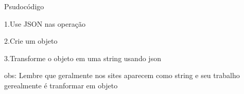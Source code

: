 Psudocódigo

1.Use JSON nas operação

2.Crie um objeto

3.Transforme o objeto em uma string usando json

obs: Lembre que geralmente nos sites aparecem como string e seu trabalho gerealmente é tranformar em objeto

